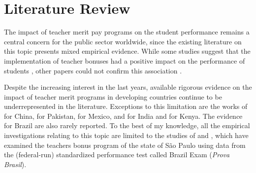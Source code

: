 \documentclass[a4paper, 12pt]{article}
\begin{document}
\section{Literature Review} \label{Paper3-Literature}





The impact of teacher merit pay programs on the student performance remains a central concern for the public sector worldwide, since the existing literature on this topic presents mixed empirical evidence. While some studies suggest that the implementation of teacher bonuses had a positive impact on the performance of students \citep[see e.g.][]{loyalka2019pay, britton2016teacher, dee2015incentives, imberman2015incentive, duflo2012incentives, lavy2009performance, muralidharan2011teacher}, other papers could not confirm this association \citep[see e.g.][]{barrera2017teacher, behrman2015aligning, yuan2013incentive, springer2012team, glewwe2010teacher}.


Despite the increasing interest in the last years, available rigorous evidence on the impact of teacher merit programs in developing countries continue to be underrepresented in the literature. Exceptions to this limitation are the works of \citet{loyalka2019pay} for China, \citet{barrera2017teacher} for Pakistan, \citet{behrman2015aligning} for Mexico, \citet{duflo2012incentives} and \citet{muralidharan2011teacher} for India and \citet{glewwe2010teacher} for Kenya. The evidence for Brazil are also rarely reported. To the best of my knowledge, all the empirical investigations relating to this topic are limited to the studies of \citet{lepine2016teacher} and \citet{oshiro2015impacto}, which have examined the teachers bonus program of the state of São Paulo using data from the (federal-run) standardized performance test called Brazil Exam (\textit{Prova Brasil}). %
\end{document}
